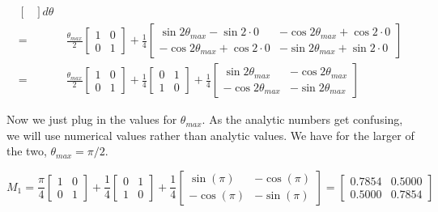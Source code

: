 \documentclass[11pt,english]{article}
\begin{document}
\begin{enumerate}
\begin{align*}
\begin{bmatrix}
        \end{bmatrix} d\theta \\ 
    =&\; \frac{\theta_{max}}{2} 
        \begin{bmatrix}
            1 & 0 \\
            0 & 1
        \end{bmatrix} + \frac{1}{4} 
        \begin{bmatrix}
            \sin 2\theta_{max} - \sin 2 \cdot 0 & -\cos 2\theta_{max} + \cos 2\cdot 0 \\
            -\cos 2\theta_{max} + \cos 2\cdot 0 & -\sin 2\theta_{max} + \sin 2 \cdot 0
        \end{bmatrix} \\ 
    =&\; \frac{\theta_{max}}{2} 
        \begin{bmatrix}
            1 & 0 \\
            0 & 1
        \end{bmatrix} + \frac{1}{4} 
        \begin{bmatrix}
            0 & 1 \\
            1 & 0
        \end{bmatrix} + \frac{1}{4} 
        \begin{bmatrix}
            \sin 2\theta_{max}  & -\cos 2\theta_{max}  \\
            -\cos 2\theta_{max} & -\sin 2\theta_{max} 
        \end{bmatrix}  
\end{align*}

Now we just plug in the values for $\theta_{max}$. As the analytic numbers get confusing, we
will use numerical values rather than analytic values. We have for the larger of the two, 
$\theta_{max} = \pi/2$.

\[
M_1 = \frac{\pi}{4} 
\begin{bmatrix}
    1 & 0 \\
    0 & 1
\end{bmatrix} + \frac{1}{4} 
\begin{bmatrix}
    0 & 1 \\
    1 & 0
\end{bmatrix} + \frac{1}{4} 
\begin{bmatrix}
    \sin (\pi)  & -\cos (\pi) \\
    -\cos (\pi) & -\sin (\pi) 
\end{bmatrix}
= \begin{bmatrix}
    0.7854 & 0.5000 \\
    0.5000 & 0.7854
\end{bmatrix} \]


\end{enumerate}
\end{document}
